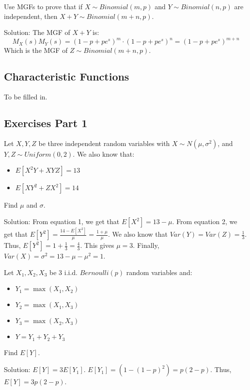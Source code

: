 \begin{exmp}{}{}
Use MGFs to prove that if \(X \sim Binomial(m,p)\) and \(Y \sim Binomial(n,p)\) are independent, then \(X + Y \sim Binomial(m + n, p)\).\newline 

Solution: The MGF of \(X + Y\) is:
\begin{equation*}
  M_X(s)M_Y(s) = (1 - p + pe^s)^m \cdot (1 - p + pe^s)^n = (1 - p + pe^s)^{m + n}
\end{equation*}
Which is the MGF of \(Z \sim Binomial(m + n, p)\).

\end{exmp}

\subsection{Characteristic Functions}
To be filled in.

\subsection{Exercises Part 1}
\begin{exmp}{}{}
Let \(X,Y,Z\) be three independent random variables with \(X \sim N(\mu,\sigma^2)\), and \(Y,Z\sim Uniform(0,2)\). We also know that:
\begin{itemize}
  \item \(E[X^2Y + XYZ] = 13\)
  \item \(E[XY^2 + ZX^2] = 14\)
\end{itemize}
Find \(\mu\) and \(\sigma\).\newline 

Solution: From equation 1, we get that \(E[X^2] = 13 - \mu\). From equation 2, we get that \(E[Y^2] = \frac{14 - E[X^2]}{\mu} = \frac{1 + \mu}{\mu}\). We also know that \(Var(Y) = Var(Z) = \frac{1}{3}\). Thus, \(E[Y^2] = 1 + \frac{1}{3} = \frac{4}{3}\). This gives \(\mu = 3\). Finally, \(Var(X) = \sigma^2 = 13 - \mu - \mu^2 = 1\).

\end{exmp}

\begin{exmp}{}{}
Let \(X_1,X_2,X_3\) be 3 i.i.d. \(Bernoulli(p)\) random variables and:
\begin{itemize}
  \item \(Y_1 = \max(X_1,X_2)\)
  \item \(Y_2 = \max(X_1,X_3)\)
  \item \(Y_3 = \max(X_2,X_3)\)
  \item \(Y = Y_1 + Y_2 + Y_3\)
\end{itemize}
Find \(E[Y]\).\newline 

Solution: \(E[Y] = 3E[Y_1]\). \(E[Y_1] = (1 - (1-p)^2) = p(2 - p)\). Thus, \(E[Y] = 3p(2-p)\).

\end{exmp}

